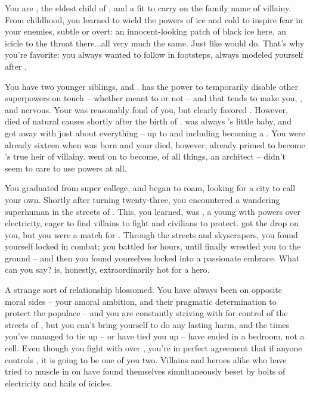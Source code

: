 \documentclass[char]{LRSguildcamp1}
\begin{document}
\name{\cOldest{}}

You are \cOldest{\intro}, the eldest child of \cGrandma{\intro}, and a \cOldest{\offspring} fit to carry on the family name of villainy.  
From childhood, you learned to wield the powers of ice and cold to inspire fear in your enemies, subtle or overt: an innocent-looking patch of black ice here, an icicle to the throat there...all very much the same. 
Just like \cGrandma{} would do.  That's why you're \cGrandma{\their} favorite: you always wanted to follow in \cGrandma{\their} footsteps, always modeled yourself after \cGrandma{\them}. %

You have two younger siblings, \cArchitect{\intro} and \cYoungest{\intro}.  \cArchitect{} has the power to temporarily disable other superpowers on touch -- whether \cArchitect{\they} meant to or not -- and that tends to make you, \cYoungest{}, and \cGrandma{} nervous.  Your \cGS{\parent} \cGS{\intro} was reasonably fond of you, but clearly favored \cArchitect{}.  However, \cGS{} died of natural causes shortly after the birth of \cYoungest{}. \cYoungest{} was always \cGrandma{}'s little baby, and got away with just about everything -- up to and including becoming a \cYoungest{\hero}.  You were already sixteen when \cYoungest{} was born and your \cGS{\parent} died, however, already primed to become \cGrandma{}'s true heir of villainy.  \cArchitect{} went on to become, of all things, an architect -- \cArchitect{\they} didn't seem to care to use \cArchitect{\their} powers at all.

You graduated from super college, and began to roam, looking for a city to call your own.  Shortly after turning twenty-three, you encountered a wandering superhuman in the streets of \pCityO{}.  This, you learned, was \cOS{\intro}, a young \cOS{\hero} with powers over electricity, eager to find villains to fight and civilians to protect.  \cOS{\They} got the drop on you, but you were a match for \cOS{\them}.   Through the streets and skyscrapers, you found yourself locked in combat; you battled for hours, until \cOS{\they} finally wrestled you to the ground -- and then you found yourselves locked into a passionate embrace.  What can you say?  \cOS{} is, honestly, extraordinarily hot for a hero.

A strange sort of relationship blossomed.  You have always been on opposite moral sides -- your amoral ambition, and their pragmatic determination to protect the populace -- and you are constantly striving with \cOS{\them} for control of the streets of \pCityO{}, but you can't bring yourself to do \cOS{\them} any lasting harm, and the times you've managed to tie \cOS{\them} up -- or \cOS{\they} have tied you up -- have ended in a bedroom, not a cell.
Even though you fight with \cOS{} over \pCityO{}, you're in perfect agreement that if anyone controls \pCityO{}, it is going to be one of you two.  Villains and heroes alike who have tried to muscle in on \pCityO{} have found themselves simultaneously beset by bolts of electricity and hails of icicles.
\end{document}
